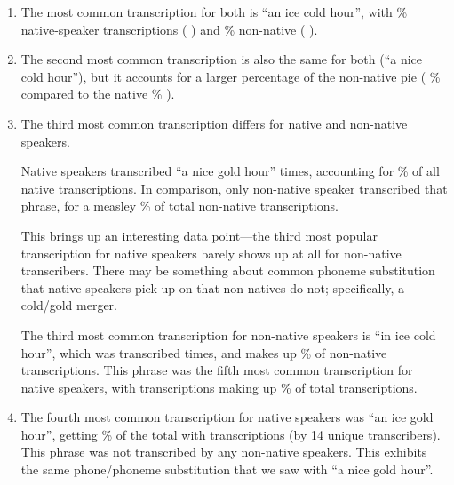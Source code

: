 \begin{enumerate}

\item The most common transcription for both is ``an ice cold hour'', with \percentTranscriptionsPerCountryAnIceColdHourEnglishDominant\% native-speaker transcriptions ( \transcriptionsPerCountryAnIceColdHourEnglishDominant) and \percentTranscriptionsPerCountryANiceColdHourNonNative\% non-native ( \transcriptionsPerCountryAnIceColdHourNonNative).

\item The second most common transcription is also the same for both (``a nice cold hour''), but it accounts for a larger percentage of the non-native pie ( \percentTranscriptionsPerCountryANiceColdHourNonNative\% compared to the native \percentTranscriptionsPerCountryANiceColdHourEnglishDominant\% ).

\item The third most common transcription differs for native and non-native speakers. 

Native speakers transcribed ``a nice gold hour'' \transcriptionsPerCountryANiceGoldHourEnglishDominant times, accounting for \percentTranscriptionsPerCountryANiceGoldHourEnglishDominant\% of all native transcriptions. In comparison, only \transcriptionsPerCountryANiceGoldHourNonNative non-native speaker transcribed that phrase, for a measley \percentTranscriptionsPerCountryANiceGoldHourNonNative\% of total non-native transcriptions. 

This brings up an interesting data point---the third most popular transcription for native speakers barely shows up at all for non-native transcribers. There may be something about common phoneme substitution that native speakers pick up on that non-natives do not; specifically, a cold/gold merger.  

 The third most common transcription for non-native speakers is ``in ice cold hour'', which was transcribed \transcriptionsPerCountryInIceColdHourNonNative times, and makes up \percentTranscriptionsPerCountryInIceColdHourNonNative\% of non-native transcriptions.  This phrase was the fifth most common transcription for native speakers, with \transcriptionsPerCountryInIceColdHourEnglishDominant transcriptions making up \percentTranscriptionsPerCountryInIceColdHourEnglishDominant\% of total transcriptions.  

\item The fourth most common transcription for native speakers was ``an ice gold hour'', getting \percentTranscriptionsPerCountryAnIceGoldHourEnglishDominant\% of the total with \transcriptionsPerCountryAnIceGoldHourEnglishDominant transcriptions (by 14 unique transcribers).  This phrase was not transcribed by any non-native speakers. This exhibits the same phone/phoneme substitution that we saw with ``a nice gold hour''.


\end{enumerate}
